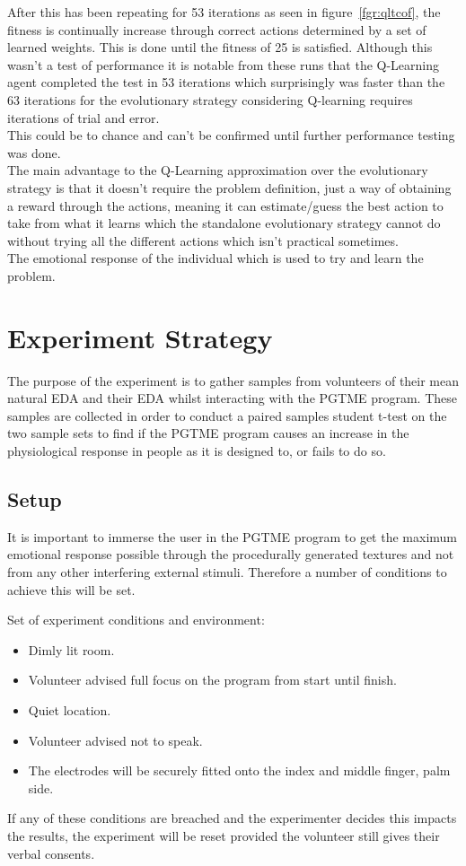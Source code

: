 \documentclass{report}
\begin{document}
After this has been repeating for 53 iterations as seen in figure~\ref{fgr:qltcof}, the fitness is continually increase through correct actions determined 
by a set of learned weights. This is done until the fitness of 25 is satisfied. Although this wasn't a test of performance it is notable from these runs that
the Q-Learning agent completed the test in 53 iterations which surprisingly was faster than the 63 iterations for the evolutionary strategy considering Q-learning requires iterations of trial and error.\\
This could be to chance and can't be confirmed until further performance testing was done.\\
The main advantage to the Q-Learning approximation over the evolutionary strategy is
that it doesn't require the problem definition, just a way of obtaining a reward through the actions, meaning it can estimate/guess the best action to take 
from what it learns which the standalone evolutionary strategy cannot do without trying all the different actions which isn't practical sometimes.\\
The emotional response of the individual which is used to try and learn the problem.

\chapter{Experiment Strategy}

The purpose of the experiment is to gather samples from volunteers of their mean natural EDA and their EDA whilst interacting with the PGTME program.
These samples are collected in order to conduct a paired samples student t-test on the two sample sets to find if the PGTME program causes an increase in the physiological response in people as it is designed 
to, or fails to do so.

\section{Setup}

It is important to immerse the user in the PGTME program to get the maximum emotional response possible through the procedurally generated textures and not 
from any other interfering external stimuli. Therefore a number of conditions to achieve this will be set.

Set of experiment conditions and environment:
\begin{itemize}
	\item Dimly lit room.
	\item Volunteer advised full focus on the program from start until finish.
	\item Quiet location.
	\item Volunteer advised not to speak.
	\item The electrodes will be securely fitted onto the index and middle finger, palm side.
\end{itemize}
If any of these conditions are breached and the experimenter decides this impacts the results, the experiment will be reset provided the volunteer still gives their verbal consents.\\
\end{document}
